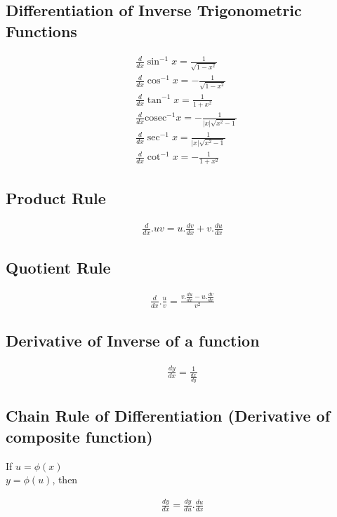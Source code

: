 \subsection{Differentiation of Inverse Trigonometric Functions}
\begin{align*}
&\frac{d}{dx}\sin^{-1} x = \frac{1}{\sqrt{1-x^2}} \\[5pt]
&\frac{d}{dx} \cos^{-1} x = -\frac{1}{\sqrt{1-x^2}} \\[5pt]
&\frac{d}{dx} \tan^{-1} x = \frac{1}{1+x^2} \\[5pt]
&\frac{d}{dx} \mathrm{cosec}^{-1} x = -\frac{1}{|x|\sqrt{x^2 - 1}}\\[5pt]
&\frac{d}{dx}\sec^{-1} x = \frac{1}{|x|\sqrt{x^2-1}} \\[5pt]
&\frac{d}{dx}\cot^{-1} x = -\frac{1}{1+x^2} 
\end{align*}

\subsection{Product Rule}
\begin{tcolorbox}
\begin{center}
\begin{align*}
\frac{d}{dx}.uv= u.\frac{dv}{dx} + v.\frac{du}{dx}
\end{align*}
\end{center}
\end{tcolorbox}

\subsection{Quotient Rule}
\begin{tcolorbox}
\begin{center}
\begin{align*}
\frac{d}{dx}.\frac{u}{v} = \frac{v.\frac{du}{dx} - u.\frac{dv}{dx}}{v^2}
\end{align*}
\end{center}
\end{tcolorbox}

\subsection{Derivative of Inverse of a function}
\begin{tcolorbox}
\begin{center}
\begin{align*}
\frac{dy}{dx} = \frac{1}{\frac{dx}{dy}}
\end{align*}
\end{center}
\end{tcolorbox}

\subsection{Chain Rule of Differentiation (Derivative of composite function)}
If $u = \phi(x)$ \\
$y = \phi(u)$, then \\
\begin{tcolorbox}
\begin{center}
\begin{align*}
\frac{dy}{dx} = \frac{dy}{du}.\frac{du}{dx} 
\end{align*}
\end{center}
\end{tcolorbox}